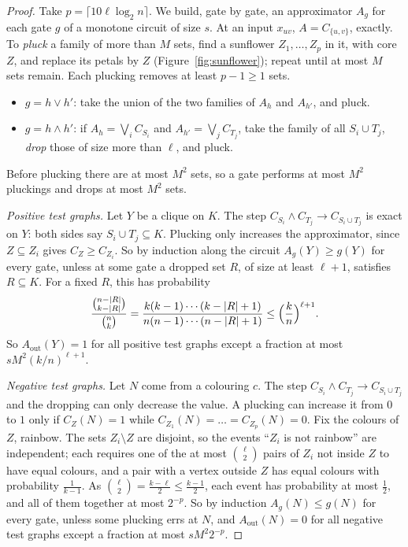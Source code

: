\begin{proof}
Take $p=\lceil10\ell\log_2n\rceil$. We build, gate by gate, an approximator $A_g$ for each gate $g$ of a monotone circuit of size $s$. At an input $x_{uv}$, $A=C_{\{u,v\}}$, exactly. To \emph{pluck} a family of more than $M$ sets, find a sunflower $Z_1,\dots,Z_p$ in it, with core $Z$, and replace its petals by $Z$ (Figure~\ref{fig:sunflower}); repeat until at most $M$ sets remain. Each plucking removes at least $p-1\ge1$ sets.
\begin{itemize}
\item $g=h\lor h'$: take the union of the two families of $A_h$ and $A_{h'}$, and pluck.
\item $g=h\land h'$: if $A_h=\bigvee_iC_{S_i}$ and $A_{h'}=\bigvee_jC_{T_j}$, take the family of all $S_i\cup T_j$, \emph{drop} those of size more than $\ell$, and pluck.
\end{itemize}
Before plucking there are at most $M^2$ sets, so a gate performs at most $M^2$ pluckings and drops at most $M^2$ sets.

\emph{Positive test graphs.} Let $Y$ be a clique on $K$. The step $C_{S_i}\land C_{T_j}\to C_{S_i\cup T_j}$ is exact on $Y$: both sides say $S_i\cup T_j\subseteq K$. Plucking only increases the approximator, since $Z\subseteq Z_i$ gives $C_Z\ge C_{Z_i}$. So by induction along the circuit $A_g(Y)\ge g(Y)$ for every gate, unless at some gate a dropped set $R$, of size at least $\ell+1$, satisfies $R\subseteq K$. For a fixed $R$, this has probability
\[
\frac{\binom{n-|R|}{k-|R|}}{\binom nk}=\frac{k(k-1)\cdots(k-|R|+1)}{n(n-1)\cdots(n-|R|+1)}\le\Bigl(\frac kn\Bigr)^{\ell+1}.
\]
So $A_{\mathrm{out}}(Y)=1$ for all positive test graphs except a fraction at most $sM^2(k/n)^{\ell+1}$.

\emph{Negative test graphs.} Let $N$ come from a colouring $c$. The step $C_{S_i}\land C_{T_j}\to C_{S_i\cup T_j}$ and the dropping can only decrease the value. A plucking can increase it from $0$ to $1$ only if $C_Z(N)=1$ while $C_{Z_1}(N)=\dots=C_{Z_p}(N)=0$. Fix the colours of $Z$, rainbow. The sets $Z_i\setminus Z$ are disjoint, so the events ``$Z_i$ is not rainbow'' are independent; each requires one of the at most $\binom\ell2$ pairs of $Z_i$ not inside $Z$ to have equal colours, and a pair with a vertex outside $Z$ has equal colours with probability $\frac1{k-1}$. As $\binom\ell2=\frac{k-\ell}2\le\frac{k-1}2$, each event has probability at most $\frac12$, and all of them together at most $2^{-p}$. So by induction $A_g(N)\le g(N)$ for every gate, unless some plucking errs at $N$, and $A_{\mathrm{out}}(N)=0$ for all negative test graphs except a fraction at most $sM^2 2^{-p}$.


\end{proof}
